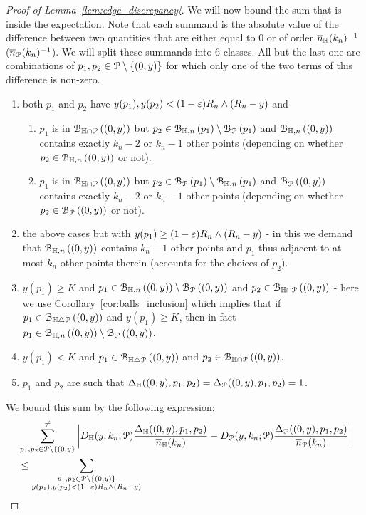\begin{proof}[Proof of Lemma~\ref{lem:edge_discrepancy}]
We will now bound the sum that is inside the expectation. 
Note that each summand is the absolute value of the difference between two quantities  
that are either equal to 0 or of order $\overline{n}_{\mathbb{H}}(k_n)^{-1}$ ($\overline{n}_{{\mathcal P}}(k_n)^{-1}$).
We will split these summands into 6 classes. All but the last one are combinations of 
$p_1, p_2\in {\mathcal P} \setminus \{(0,y)\}$ for which only one of the two terms of this difference
is non-zero. 
\begin{enumerate} 
\item both $p_1$ and $p_2$ have $y(p_1),y(p_2) < (1-\varepsilon ) R_n \wedge (R_n-y)$ and 
\begin{enumerate}
\item $p_1$ is in ${\mathcal B}_{\mathbb{H} \cap {\mathcal P}}\left((0,y)\right)$ but $p_2 \in {\mathcal B}_{\mathbb{H},n}\left(p_1\right) \setminus {\mathcal B}_{{\mathcal P}}\left(p_1\right)$ 
and ${\mathcal B}_{\mathbb{H},n}\left((0,y)\right)$ contains exactly $k_n-2$ or $k_n-1$ other points (depending on whether 
$p_2 \in {\mathcal B}_{\mathbb{H},n}\left((0,y)\right)$ or not).
\item $p_1$ is in ${\mathcal B}_{\mathbb{H} \cap {\mathcal P}}\left((0,y)\right)$ but $p_2 \in {\mathcal B}_{{\mathcal P}}\left(p_1\right) \setminus {\mathcal B}_{\mathbb{H},n}\left(p_1\right)$ 
and ${\mathcal B}_{{\mathcal P}}\left((0,y)\right)$ contains exactly $k_n-2$ or $k_n-1$ other points (depending on whether 
$p_2 \in {\mathcal B}_{{\mathcal P}}\left((0,y)\right)$ or not).
\end{enumerate}
\item the above cases but with $y(p_1) \geq (1-\varepsilon) R_n \wedge (R_n -y)$ - in this 
we demand that ${\mathcal B}_{\mathbb{H},n}\left((0,y)\right)$ contains $k_n-1$ other points and $p_1$ thus adjacent 
to at most $k_n$ other points therein (accounts for the choices of $p_2$). 
\item $y(p_1) \geq K$ and $p_1 \in {\mathcal B}_{\mathbb{H},n}\left((0,y)\right) \setminus 
{\mathcal B}_{{\mathcal P}}\left((0,y)\right)$ and $p_2 \in {\mathcal B}_{\mathbb{H} \cap {\mathcal P}}\left((0,y)\right)$ - here we use 
Corollary~\ref{cor:balls_inclusion} which implies that if $p_1 \in {\mathcal B}_{\mathbb{H} \bigtriangleup {\mathcal P}}\left((0,y)\right)$ and $y(p_1) \geq K$, then in fact $p_1 \in {\mathcal B}_{\mathbb{H},n}\left((0,y)\right) \setminus 
{\mathcal B}_{{\mathcal P}}\left((0,y)\right)$. 
\item $y(p_1) < K$ and $p_1 \in {\mathcal B}_{\mathbb{H} \bigtriangleup {\mathcal P}}\left((0,y)\right)$ and $p_2 \in {\mathcal B}_{\mathbb{H} \cap {\mathcal P}}\left((0,y)\right)$. 
\item $p_1$ and $p_2$ are such that $\Delta_{\mathbb{H}} ((0,y),p_1,p_2)=\Delta_{{\mathcal P}} ((0,y),p_1,p_2)=1$. 
\end{enumerate}
We bound this sum by the following expression:
\begin{align*} 
&\sum_{p_1,p_2 \in \Pcal \setminus \{(0,y\}}^{\not =} 
  \left| D_{\H}(y,k_n; \Pcal) \frac{\Delta_\H((0,y),p_1,p_2)}{\expH}  
  	- D_{\Pcal} (y,k_n;\Pcal) \frac{\Delta_{\Pcal}((0,y),p_1,p_2)}{\expP} \right|\\ 
&\le \sum_{\substack{p_1,p_2\in \Pcal \setminus \{(0,y)\}\\  y(p_1),y(p_2)< (1-\eps)R_n \wedge (R_n-y)}} 

\end{align*}
\end{proof}
